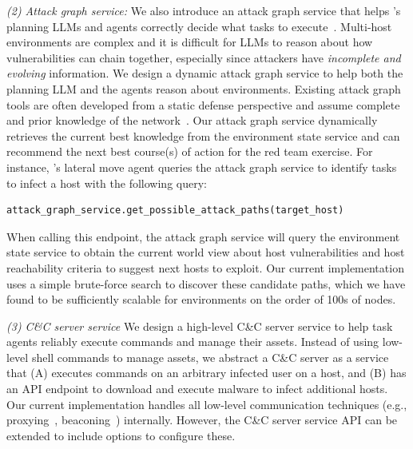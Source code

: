 \emph{(2) Attack graph service:}
We also introduce an attack graph service that helps \sys's planning LLMs and agents correctly decide what tasks to execute~\cite{attack_graph_og}.
 Multi-host environments are complex and it  is difficult for LLMs to  reason about how vulnerabilities can chain together, especially since attackers have {\em incomplete and evolving} information.
We design a dynamic attack graph service to help both the planning LLM and the agents reason about environments.
 Existing attack graph tools are often developed from a static defense perspective and assume complete and prior knowledge of the network~\cite{OG_MULVAL, ou2006scalable}.
Our attack graph service  dynamically  retrieves  the current best knowledge   from the environment state service and can recommend the next best course(s) of action for the red team exercise.
For instance, \sys's lateral move agent queries the attack graph service to identify tasks to infect a host with the following query:
\begin{lstlisting}[language=Python,
caption={}]
attack_graph_service.get_possible_attack_paths(target_host)
\end{lstlisting}

\noindent When calling this endpoint, the attack graph service will query the environment state service to obtain the current world view about  host vulnerabilities and host reachability criteria to suggest next  hosts to exploit.
 Our current implementation uses a simple  brute-force search to discover   these candidate  paths, which we have found to be sufficiently scalable  for environments on the order of 100s of nodes.


\emph{(3) C\&C server service}
We design a high-level C\&C server service to help task agents reliably execute commands and manage their assets.
Instead of using low-level shell commands to manage assets, we abstract a C\&C server as a service that (A) executes commands on an arbitrary infected user on a host, and (B) has an API endpoint to download and execute malware to infect additional hosts.
Our current implementation   handles all low-level communication techniques (e.g., proxying~\cite{metasploit}, beaconing~\cite{caldera}) internally.
However, the C\&C server service API can be extended to include options to configure these.
